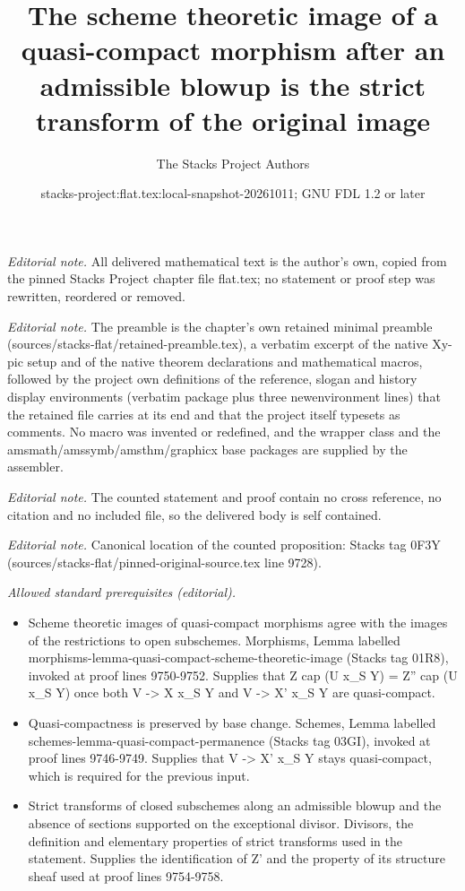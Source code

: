 \documentclass[10pt,a4paper]{amsart}
\title{The scheme theoretic image of a quasi-compact morphism after an admissible blowup is the strict transform of the original image}
\author{The Stacks Project Authors}
\date{stacks-project:flat.tex:local-snapshot-20261011; GNU FDL 1.2 or later}
\theoremstyle{plain}
\theoremstyle{definition}
\theoremstyle{remark}
\numberwithin{equation}{subsection}
\begin{document}
\maketitle
\noindent\textit{Editorial note.} All delivered mathematical text is the author's own, copied from the pinned Stacks Project chapter file flat.tex; no statement or proof step was rewritten, reordered or removed.\par\medskip
\noindent\textit{Editorial note.} The preamble is the chapter's own retained minimal preamble (sources/stacks-flat/retained-preamble.tex), a verbatim excerpt of the native Xy-pic setup and of the native theorem declarations and mathematical macros, followed by the project own definitions of the reference, slogan and history display environments (verbatim package plus three newenvironment lines) that the retained file carries at its end and that the project itself typesets as comments. No macro was invented or redefined, and the wrapper class and the amsmath/amssymb/amsthm/graphicx base packages are supplied by the assembler.\par\medskip
\noindent\textit{Editorial note.} The counted statement and proof contain no cross reference, no citation and no included file, so the delivered body is self contained.\par\medskip
\noindent\textit{Editorial note.} Canonical location of the counted proposition: Stacks tag 0F3Y (sources/stacks-flat/pinned-original-source.tex line 9728).\par\medskip
\noindent\textit{Allowed standard prerequisites (editorial).}\begin{itemize}
\item Scheme theoretic images of quasi-compact morphisms agree with the images of the restrictions to open subschemes. Morphisms, Lemma labelled morphisms-lemma-quasi-compact-scheme-theoretic-image (Stacks tag 01R8), invoked at proof lines 9750-9752. Supplies that Z cap (U x\_S Y) = Z'' cap (U x\_S Y) once both V -> X x\_S Y and V -> X' x\_S Y are quasi-compact.
\item Quasi-compactness is preserved by base change. Schemes, Lemma labelled schemes-lemma-quasi-compact-permanence (Stacks tag 03GI), invoked at proof lines 9746-9749. Supplies that V -> X' x\_S Y stays quasi-compact, which is required for the previous input.
\item Strict transforms of closed subschemes along an admissible blowup and the absence of sections supported on the exceptional divisor. Divisors, the definition and elementary properties of strict transforms used in the statement. Supplies the identification of Z' and the property of its structure sheaf used at proof lines 9754-9758.
\end{itemize}\medskip
\end{document}
